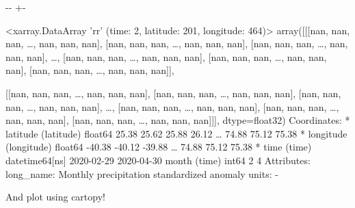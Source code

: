 \documentclass[letterpaper,10pt,english]{sphinxmanual}
\newlength\nbsphinxcodecellspacing
\begin{document}
{

\kern-\sphinxverbatimsmallskipamount\kern-\baselineskip
\kern+\FrameHeightAdjust\kern-\fboxrule
\vspace{\nbsphinxcodecellspacing}

\begin{sphinxVerbatim}[commandchars=\\\{\}]
\llap{\color{nbsphinxout}[38]:\,\hspace{\fboxrule}\hspace{\fboxsep}}<xarray.DataArray 'rr' (time: 2, latitude: 201, longitude: 464)>
array([[[nan, nan, nan, {\ldots}, nan, nan, nan],
        [nan, nan, nan, {\ldots}, nan, nan, nan],
        [nan, nan, nan, {\ldots}, nan, nan, nan],
        {\ldots},
        [nan, nan, nan, {\ldots}, nan, nan, nan],
        [nan, nan, nan, {\ldots}, nan, nan, nan],
        [nan, nan, nan, {\ldots}, nan, nan, nan]],

       [[nan, nan, nan, {\ldots}, nan, nan, nan],
        [nan, nan, nan, {\ldots}, nan, nan, nan],
        [nan, nan, nan, {\ldots}, nan, nan, nan],
        {\ldots},
        [nan, nan, nan, {\ldots}, nan, nan, nan],
        [nan, nan, nan, {\ldots}, nan, nan, nan],
        [nan, nan, nan, {\ldots}, nan, nan, nan]]], dtype=float32)
Coordinates:
  * latitude   (latitude) float64 25.38 25.62 25.88 26.12 {\ldots} 74.88 75.12 75.38
  * longitude  (longitude) float64 -40.38 -40.12 -39.88 {\ldots} 74.88 75.12 75.38
  * time       (time) datetime64[ns] 2020-02-29 2020-04-30
    month      (time) int64 2 4
Attributes:
    long\_name:  Monthly precipitation standardized anomaly
    units:      -
\end{sphinxVerbatim}
}

And plot using cartopy!
\end{document}
